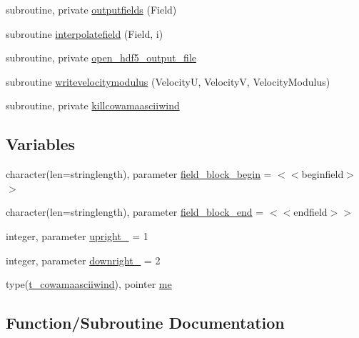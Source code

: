 \begin{DoxyCompactItemize}
\item 
subroutine, private \mbox{\hyperlink{namespacemodulecowamaasciiwind_a67476e8fa757d63b3e48664bcc8b1b96}{outputfields}} (Field)
\item 
subroutine \mbox{\hyperlink{namespacemodulecowamaasciiwind_a3a43fe146a563746fe8d8ed4fb89732c}{interpolatefield}} (Field, i)
\item 
subroutine, private \mbox{\hyperlink{namespacemodulecowamaasciiwind_aea5f2ecc6c72b859765645c42c117f81}{open\+\_\+hdf5\+\_\+output\+\_\+file}}
\item 
subroutine \mbox{\hyperlink{namespacemodulecowamaasciiwind_af4f03b22c10470dbdcdaa2f8ab7713d9}{writevelocitymodulus}} (VelocityU, VelocityV, Velocity\+Modulus)
\item 
subroutine, private \mbox{\hyperlink{namespacemodulecowamaasciiwind_a23a57a057fbbc4351c19799391d3736b}{killcowamaasciiwind}}
\end{DoxyCompactItemize}
\subsection*{Variables}
\begin{DoxyCompactItemize}
\item 
character(len=stringlength), parameter \mbox{\hyperlink{namespacemodulecowamaasciiwind_a1178a80523317c2c8a9ccd40ccf90e45}{field\+\_\+block\+\_\+begin}} = \textquotesingle{}$<$$<$beginfield$>$$>$\textquotesingle{}
\item 
character(len=stringlength), parameter \mbox{\hyperlink{namespacemodulecowamaasciiwind_a161fd86ec10f57025d009b25ac4e6186}{field\+\_\+block\+\_\+end}} = \textquotesingle{}$<$$<$endfield$>$$>$\textquotesingle{}
\item 
integer, parameter \mbox{\hyperlink{namespacemodulecowamaasciiwind_aeec465400026a2de4132b8649e10a8e8}{upright\+\_\+}} = 1
\item 
integer, parameter \mbox{\hyperlink{namespacemodulecowamaasciiwind_a67c52eb5a4004f3fce04141135430ceb}{downright\+\_\+}} = 2
\item 
type(\mbox{\hyperlink{structmodulecowamaasciiwind_1_1t__cowamaasciiwind}{t\+\_\+cowamaasciiwind}}), pointer \mbox{\hyperlink{namespacemodulecowamaasciiwind_af2e1e1fb6a310103abe149dc2b8b232e}{me}}
\end{DoxyCompactItemize}


\subsection{Function/\+Subroutine Documentation}
\mbox{\label{namespacemodulecowamaasciiwind_a267c21bbee12efe50d8afcde5075671c}} 
